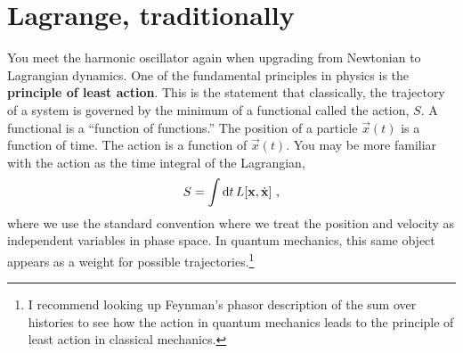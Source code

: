 \section{Lagrange, traditionally}
\label{sec:lagrange:spring:theory}

You meet the harmonic oscillator again when upgrading from Newtonian to Lagrangian dynamics. 
% 
One of the fundamental principles in physics is the \textbf{principle of least action}. This is the statement that classically, the trajectory of a system is governed by the minimum of a functional called the action, $S$. A functional is a ``function of functions.'' The position of a particle $\vec{x}(t)$ is a function of time. The action is a function of $\vec{x}(t)$. You may be more familiar with the action as the time integral of the Lagrangian,
\begin{align}
    S = \int \operatorname{d}\mkern-3mu^{}\mkern-1mu{t}\, L[\mathbf{x}, \dot{\mathbf{x}}] \ ,
\end{align}
where we use the standard convention where we treat the position and velocity as independent variables in phase space. In quantum mechanics, this same object appears as a weight for possible trajectories.\footnote{I recommend looking up Feynman's phasor description of the sum over histories to see how the action in quantum mechanics leads to the principle of least action in classical mechanics.}


